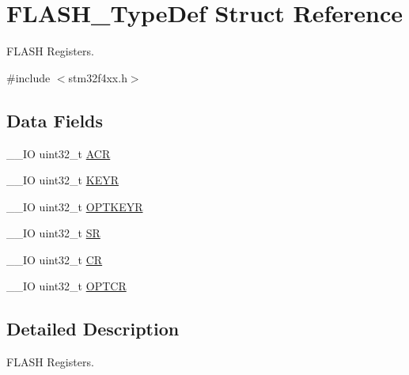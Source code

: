 \hypertarget{struct_f_l_a_s_h___type_def}{\section{F\-L\-A\-S\-H\-\_\-\-Type\-Def Struct Reference}
\label{struct_f_l_a_s_h___type_def}
}


F\-L\-A\-S\-H Registers.  




{\ttfamily \#include $<$stm32f4xx.\-h$>$}

\subsection*{Data Fields}
\begin{DoxyCompactItemize}
\item 
\-\_\-\-\_\-\-I\-O uint32\-\_\-t \hyperlink{struct_f_l_a_s_h___type_def_a9cb55206b29a8c16354747c556ab8bea}{A\-C\-R}
\item 
\-\_\-\-\_\-\-I\-O uint32\-\_\-t \hyperlink{struct_f_l_a_s_h___type_def_a84c491be6c66b1d5b6a2efd0740b3d0c}{K\-E\-Y\-R}
\item 
\-\_\-\-\_\-\-I\-O uint32\-\_\-t \hyperlink{struct_f_l_a_s_h___type_def_afc4900646681dfe1ca43133d376c4423}{O\-P\-T\-K\-E\-Y\-R}
\item 
\-\_\-\-\_\-\-I\-O uint32\-\_\-t \hyperlink{struct_f_l_a_s_h___type_def_af6aca2bbd40c0fb6df7c3aebe224a360}{S\-R}
\item 
\-\_\-\-\_\-\-I\-O uint32\-\_\-t \hyperlink{struct_f_l_a_s_h___type_def_ab40c89c59391aaa9d9a8ec011dd0907a}{C\-R}
\item 
\-\_\-\-\_\-\-I\-O uint32\-\_\-t \hyperlink{struct_f_l_a_s_h___type_def_acfef9b6d7da4271943edc04d7dfdf595}{O\-P\-T\-C\-R}
\end{DoxyCompactItemize}


\subsection{Detailed Description}
F\-L\-A\-S\-H Registers. 

